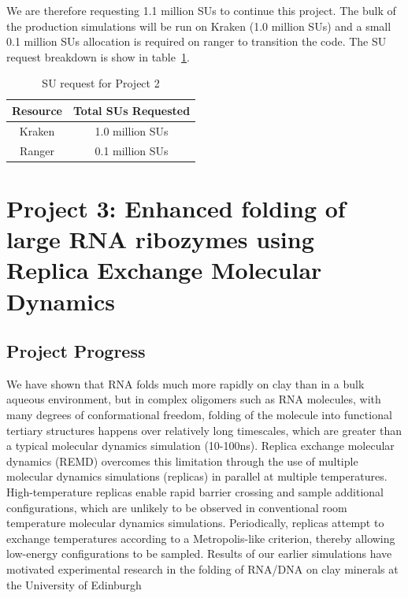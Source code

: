 \documentclass[a4paper,10pt]{article}
\newcommand{\up}{\vspace*{-1em}}
\begin{document}
We are therefore requesting 1.1 million SUs to continue this project. The bulk of the production simulations will be run on Kraken (1.0 million SUs) and a small 0.1 million SUs allocation is required on ranger to transition the code. The SU request breakdown is show in table~\ref{table:project22}.

\begin{table}[!h]
\begin{center}
\begin{tabular}{|c|c| }
\hline 
Resource & Total SUs Requested \\ 
\hline
Kraken   & 1.0 million SUs \\
\hline
Ranger   & 0.1 million SUs \\
\hline
\end{tabular}
\end{center}
  \caption{SU request for Project 2}\label{table:project22}
\up
\end{table}




\section{Project 3: Enhanced folding of large RNA ribozymes using Replica Exchange Molecular Dynamics}

\subsection{Project Progress}

We have shown that RNA folds much more rapidly on clay than in a bulk aqueous environment,
but in complex oligomers such as RNA molecules, with many degrees of conformational freedom, folding of the molecule into functional tertiary structures happens over relatively long timescales, which are greater than a typical molecular dynamics simulation (10-100ns). Replica exchange molecular dynamics (REMD) overcomes this limitation through the use of multiple molecular dynamics simulations (replicas) in parallel at multiple temperatures. High-temperature replicas enable rapid barrier crossing and sample additional configurations, which are unlikely to be observed in conventional room temperature molecular dynamics simulations. Periodically, replicas attempt to exchange temperatures according to a Metropolis-like criterion, thereby allowing low-energy configurations to be sampled. Results of our earlier simulations have motivated experimental research in the folding of RNA/DNA on clay minerals at the University of Edinburgh
\end{document}
